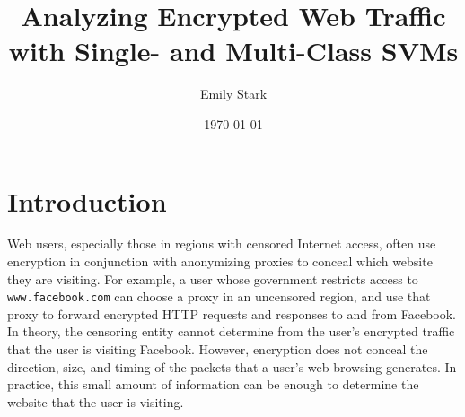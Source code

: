 \documentclass[10pt, twocolumn]{article}
\title{Analyzing Encrypted Web Traffic with Single- and Multi-Class SVMs}
\author{Emily Stark}
\date{\today}                                          %
\begin{document}
\maketitle

\section{Introduction}
Web users, especially those in regions with censored 
Internet access, often use encryption in conjunction 
with anonymizing proxies to conceal which website 
they are visiting. For example, a user whose government 
restricts access to \texttt{www.facebook.com} can choose a 
proxy in an uncensored region, and use that proxy to 
forward encrypted HTTP requests and responses to and 
from Facebook. In theory, the censoring entity cannot determine from 
the user's encrypted traffic that the user is visiting 
Facebook. However, encryption does not conceal the direction, 
size, and timing of the packets that a user's web browsing 
generates. In practice, this small amount of information can 
be enough to determine the website that the user is visiting.
\end{document}
